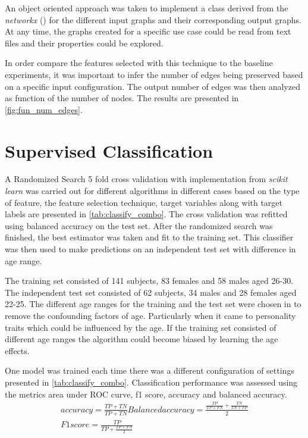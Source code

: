 \documentclass[msthesis.tex]{subfiles}
\begin{document}
An object oriented approach was taken to implement a class derived from the \textit{networkx} (\cite{hagberg2008exploring}) for the different input graphs and their corresponding output graphs. At any time, the graphs created for a specific use case could be read from text files and their properties could be explored.

In order compare the features selected with this technique to the baseline experiments, it was important to infer the number of edges being preserved based on a specific input configuration. The output number of edges was then analyzed as function of the number of nodes. The results are presented in \autoref{fig:fun_num_edges}.


\section{Supervised Classification}

A Randomized Search 5 fold cross validation with implementation from \textit{scikit learn} was carried out for different algorithms in different cases based on the type of feature, the feature selection technique, target variables along with target labels are presented in \autoref{tab:classify_combo}. The cross validation was refitted using balanced accuracy on the test set. After the randomized search was finished, the best estimator was taken and fit to the training set. This classifier was then used to make predictions on an independent test set with difference in age range.

The training set consisted of 141 subjects, 83 females and 58 males aged 26-30. The independent test set consisted of 62 subjects, 34 males and 28 females aged 22-25. The different age ranges for the training and the test set were chosen in to remove the confounding factors of age. Particularly when it came to personality traits which could be influenced by the age. If the training set consisted of different age ranges the algorithm could become biased by learning the age effects.

One model was trained each time there was a different configuration of settings presented in \autoref{tab:classify_combo}. Classification performance was assessed using the metrics area under ROC curve, f1 score, accuracy and balanced accuracy. 
\ifalse
\begin{align}
    accuracy = \frac{TP + TN}{TP + TN}
    Balanced accuracy = \frac{\frac{TP}{TP + FN} + \frac{TN}{TN + FP}}{2} \\
    F1 score = \frac{TP}{TP + \frac{TP + FN}{2}}
\end{align}
\fi
\end{document}
